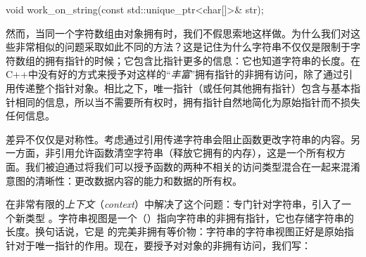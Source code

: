 \begin{code}
void work_on_string(const std::unique_ptr<char[]>& str);
\end{code}

然而，当同一个字符数组由对象拥有时，我们不假思索地这样做。为什么我们对这些非常相似的问题采取如此不同的方法？这是记住为什么字符串不仅仅是限制于字符数组的拥有指针的时候；它包含比指针更多的信息：它也知道字符串的长度。在C++中没有好的方式来授予对这样的“\emph{丰富}”拥有指针的非拥有访问，除了通过引用传递整个指针对象。相比之下，唯一指针（或任何其他拥有指针）包含与基本指针相同的信息，所以当不需要所有权时，拥有指针自然地简化为原始指针而不损失任何信息。

差异不仅仅是对称性。考虑通过引用传递字符串会阻止函数更改字符串的内容。另一方面，非引用允许函数清空字符串（释放它拥有的内存），这是一个所有权方面。我们被迫通过将我们可以授予函数的两种不相关的访问类型混合在一起来混淆意图的清晰性：更改数据内容的能力和数据的所有权。

\cpp[17]在非常有限的\emph{上下文}（\emph{context}）中解决了这个问题：专门针对字符串，引入了一个新类型 。字符串视图是一个（）指向字符串的非拥有指针，它也存储字符串的长度。换句话说，它是  的完美非拥有等价物：字符串的字符串视图正好是原始指针对于唯一指针的作用。现在，要授予对对象的非拥有访问，我们写：

